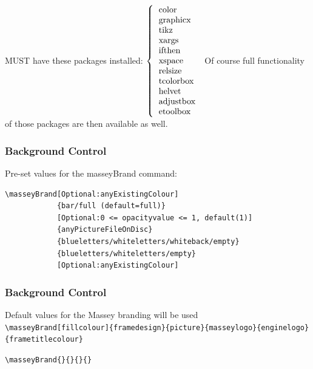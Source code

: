 \documentclass[10pt,aspectratio=43]{beamer}
\begin{document}
\begin{frame}[fragile]

MUST have these packages installed: $\left\{
\begin{tabular}{l}
color\\
graphicx\\
tikz\\
xargs\\
ifthen\\
xspace\\
relsize\\
tcolorbox\\
helvet\\
adjustbox\\
etoolbox\\
\end{tabular}\right.$
\vfill
Of course full functionality of those packages are then available as well.
\vfill\null
\end{frame}



\masseyBrand{}{}{}{}

\begin{frame}[fragile]
\frametitle{Background Control}
Pre-set values for the masseyBrand command:
{\footnotesize
\begin{verbatim}
\masseyBrand[Optional:anyExistingColour]
            {bar/full (default=full)}
            [Optional:0 <= opacityvalue <= 1, default(1)]
            {anyPictureFileOnDisc}
            {blueletters/whiteletters/whiteback/empty}
            {blueletters/whiteletters/empty}
            [Optional:anyExistingColour]
\end{verbatim}
}
\end{frame}


\begin{frame}[fragile]
\frametitle{Background Control}
Default values for the Massey branding will be used\\[2ex]
{\footnotesize
\verb|\masseyBrand[fillcolour]{framedesign}{picture}{masseylogo}{enginelogo}{frametitlecolour}|}

\verb|\masseyBrand{}{}{}{}|
\end{frame}

\masseyBrand[masseyTasman]{}{}{}{}
\end{document}
